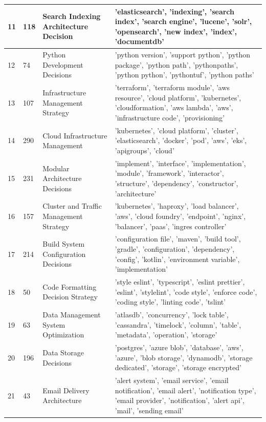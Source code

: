 \begin{longtable}{|p{1cm}|p{1.12cm}|p{3.3cm}|p{9cm}|}
            \hline
            11 & 118 & Search Indexing Architecture Decision & 'elasticsearch', 'indexing', 'search index', 'search engine', 'lucene', 'solr', 'opensearch', 'new index', 'index', 'documentdb' \\
            \hline
            12 & 74 & Python Development Decisions & 'python version', 'support python', 'python package', 'python path', 'pythonpaths', 'python python', 'pythontuf', 'python paths' \\
            \hline
            13 & 107 & Infrastructure Management Strategy & 'terraform', 'terraform module', 'aws resource', 'cloud platform', 'kubernetes', 'cloudformation', 'aws lambda', 'aws', 'infrastructure code', 'provisioning' \\
            \hline
            14 & 290 & Cloud Infrastructure Management & 'kubernetes', 'cloud platform', 'cluster', 'elasticsearch', 'docker', 'pod', 'aws', 'eks', 'apigroups', 'cloud' \\
            \hline
            15 & 231 & Modular Architecture Decisions & 'implement', 'interface', 'implementation', 'module', 'framework', 'interactor', 'structure', 'dependency', 'constructor', 'architecture' \\
            \hline
            16 & 157 & Cluster and Traffic Management Strategy & 'kubernetes', 'haproxy', 'load balancer', 'aws', 'cloud foundry', 'endpoint', 'nginx', 'balancer', 'paas', 'ingres controller' \\
            \hline
            17 & 214 & Build System Configuration Decisions & 'configuration file', 'maven', 'build tool', 'gradle', 'configuration', 'dependency', 'config', 'kotlin', 'environment variable', 'implementation' \\
            \hline
            18 & 50 & Code Formatting Decision Strategy & 'style eslint', 'typescript', 'eslint prettier', 'eslint', 'stylelint', 'code style', 'enforce code', 'coding style', 'linting code', 'tslint' \\
            \hline
            19 & 63 & Data Management System Optimization & 'atlasdb', 'concurrency', 'lock table', 'cassandra', 'timelock', 'column', 'table', 'metadata', 'operation', 'storage' \\
            \hline
            20 & 196 & Data Storage Decisions & 'postgres', 'azure blob', 'database', 'aws', 'azure', 'blob storage', 'dynamodb', 'storage dedicated', 'storage', 'storage encrypted' \\
            \hline
            21 & 43 & Email Delivery Architecture & 'alert system', 'email service', 'email notification', 'email alert', 'notification type', 'email provider', 'notification', 'alert api', 'mail', 'sending email' \\
            \hline
        \end{longtable}

